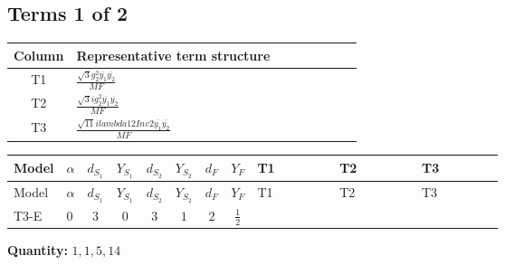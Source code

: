 \documentclass[8pt]{article}
\begin{document}
\begin{landscape}
\subsection*{Terms 1 of 2}
\begin{center}
\begin{tabular}{@{}c >{\raggedright\arraybackslash}p{0.82\linewidth}@{}}
\toprule
Column & Representative term structure \\
\midrule
T1 & \(\displaystyle \frac{\sqrt{3} g_{2}^{2} \overline{y_{1}} \overline{y_{2}}}{MF}\) \\
\midrule
T2 & \(\displaystyle \frac{\sqrt{3} i g_{2}^{2} \overline{y_{1}} \overline{y_{2}}}{MF}\) \\
\midrule
T3 & \(\displaystyle \frac{\sqrt{11} i lambda12Inv2 \overline{y_{1}} \overline{y_{2}}}{MF}\) \\
\midrule
\bottomrule
\end{tabular}
\end{center}
\smallskip
\tiny
\begin{longtable}{@{}llcccccc >{\raggedright\arraybackslash}p{0.21\linewidth} >{\raggedright\arraybackslash}p{0.21\linewidth} >{\raggedright\arraybackslash}p{0.21\linewidth}@{}}
\toprule
Model & $\alpha$ & $d_{S_1}$ & $Y_{S_1}$ & $d_{S_2}$ & $Y_{S_2}$ & $d_F$ & $Y_F$ & T1 & T2 & T3 \\
\midrule
\endfirsthead
\toprule
Model & $\alpha$ & $d_{S_1}$ & $Y_{S_1}$ & $d_{S_2}$ & $Y_{S_2}$ & $d_F$ & $Y_F$ & T1 & T2 & T3 \\
\midrule
\endhead
T3-E & $0$ & $3$ & $0$ & $3$ & $1$ & $2$ & $\frac{1}{2}$ & \scriptsize\adjustbox{max width=\linewidth}{$\begin{gathered} \frac{\sqrt{3} g_{2}^{2} \overline{y_{1}} \overline{y_{2}}}{6 MF}\end{gathered}$} & \scriptsize\adjustbox{max width=\linewidth}{$\begin{gathered} - \frac{11 \sqrt{3} i g_{2}^{2} \overline{y_{1}} \overline{y_{2}}}{8 MF}\end{gathered}$} & \scriptsize\adjustbox{max width=\linewidth}{$\begin{gathered} - \frac{3 \sqrt{11} i lambda12Inv2 \overline{y_{1}} \overline{y_{2}}}{22 MF}\end{gathered}$} \\
\midrule
\bottomrule
\end{longtable}
\clearpage
\noindent\textbf{Quantity: }$\mathrm{1,1,5,14}$\par\smallskip

\end{landscape}
\end{document}
